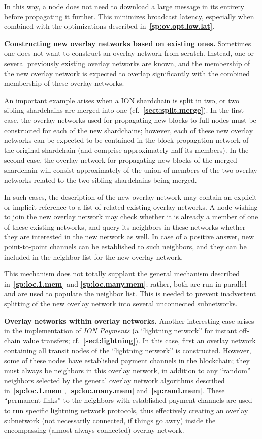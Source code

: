\documentclass[12pt,oneside]{article}
\def\makepoint#1{\medbreak\noindent{\bf #1.\ }}
\def\nxsubpoint{\refstepcounter{subsubsection}%
  \smallbreak\makepoint{\thesubsubsection}}
\def\refpoint#1{{\rm\textbf{\ref{#1}}}}
\let\ptref=\refpoint
\def\embt(#1.){\textbf{#1.}}
\begin{document}
In this way, a node does not need to download a large message in its
entirety before propagating it further. This minimizes broadcast
latency, especially when combined with the optimizations described
in~\ptref{sp:ov.opt.low.lat}.

\nxsubpoint \embt(Constructing new overlay networks based on existing
ones.)  Sometimes one does not want to construct an overlay network
from scratch. Instead, one or several previously existing overlay
networks are known, and the membership of the new overlay network is
expected to overlap significantly with the combined membership of
these overlay networks.

An important example arises when a ION shardchain is split in two, or
two sibling shardchains are merged into one
(cf.~\ptref{sect:split.merge}). In the first case, the overlay
networks used for propagating new blocks to full nodes must be
constructed for each of the new shardchains; however, each of these
new overlay networks can be expected to be contained in the block
propagation network of the original shardchain (and comprise
approximately half its members). In the second case, the overlay
network for propagating new blocks of the merged shardchain will
consist approximately of the union of members of the two overlay
networks related to the two sibling shardchains being merged.

In such cases, the description of the new overlay network may contain
an explicit or implicit reference to a list of related existing
overlay networks. A node wishing to join the new overlay network may
check whether it is already a member of one of these existing
networks, and query its neighbors in these networks whether they are
interested in the new network as well. In case of a positive answer,
new point-to-point channels can be established to such neighbors, and
they can be included in the neighbor list for the new overlay network.

This mechanism does not totally supplant the general mechanism
described in~\ptref{sp:loc.1.mem} and \ptref{sp:loc.many.mem}; rather,
both are run in parallel and are used to populate the neighbor
list. This is needed to prevent inadvertent splitting of the new
overlay network into several unconnected subnetworks.

\nxsubpoint\label{sp:net.within.net} \embt(Overlay networks within
overlay networks.)  Another interesting case arises in the
implementation of {\em ION Payments} (a ``lightning network'' for
instant off-chain value transfers; cf.~\ptref{sect:lightning}). In
this case, first an overlay network containing all transit nodes of
the ``lightning network'' is constructed. However, some of these nodes
have established payment channels in the blockchain; they must always
be neighbors in this overlay network, in addition to any ``random''
neighbors selected by the general overlay network algorithms described
in~\ptref{sp:loc.1.mem}, \ptref{sp:loc.many.mem}
and~\ptref{sp:rand.mem}. These ``permanent links'' to the neighbors
with established payment channels are used to run specific lightning
network protocols, thus effectively creating an overlay subnetwork
(not necessarily connected, if things go awry) inside the encompassing
(almost always connected) overlay network.
\end{document}
